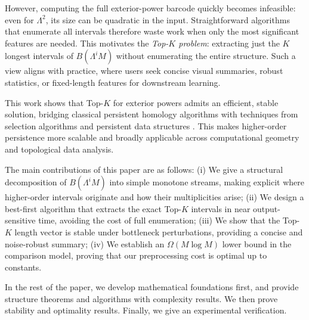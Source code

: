 \documentclass[runningheads]{llncs}
\newcommand{\B}{B}
\newcommand{\Lam}{\Lambda}
\begin{document}
However, computing the full exterior-power barcode quickly becomes infeasible: even for $\Lam^2$, its size can be quadratic in the input. Straightforward algorithms that enumerate all intervals therefore waste work when only the most significant features are needed. This motivates the \emph{Top-$K$ problem}: extracting just the $K$ longest intervals of $\B(\Lam^i M)$ without enumerating the entire structure. Such a view aligns with practice, where users seek concise visual summaries, robust statistics, or fixed-length features for downstream learning.

This work shows that Top-$K$ for exterior powers admits an efficient, stable solution, bridging classical persistent homology algorithms \cite{ELZ02,ZC05,BauerRipser21} with techniques from selection algorithms \cite{Fagin03,FredericksonJohnson84} and persistent data structures \cite{DriscollEtAl89}. This makes higher-order persistence more scalable and broadly applicable across computational geometry and topological data analysis.

The main contributions of this paper are as follows: (i) We give a structural decomposition of $\B(\Lam^i M)$ into simple monotone streams, making explicit where higher-order intervals originate and how their multiplicities arise; (ii) We design a best-first algorithm that extracts the exact Top-$K$ intervals in near output-sensitive time, avoiding the cost of full enumeration; (iii) We show that the Top-$K$ length vector is stable under bottleneck perturbations, providing a concise and noise-robust summary; (iv) We establish an $\Omega(M\log M)$ lower bound in the comparison model, proving that our preprocessing cost is optimal up to constants.

In the rest of the paper, we develop mathematical foundations first, and provide structure theorems and algorithms with complexity results. We then prove stability and optimality results. Finally, we give an experimental verification. 

\end{document}

